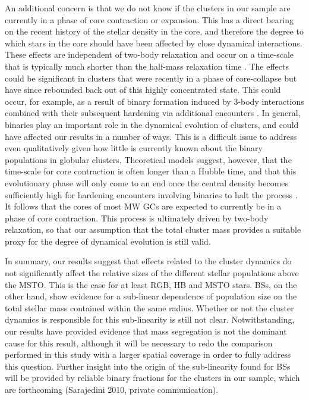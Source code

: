 An additional concern is that we do not know if the clusters in our
sample are currently in a phase of core contraction or expansion.  
This has a direct bearing on the recent history of the stellar density
in the core, and therefore the degree to which stars in the core
should have been affected by close dynamical interactions.  These
effects are independent of two-body relaxation and occur on a
time-scale that is typically much shorter than the half-mass relaxation
time \citep{heggie03}.  The effects could be significant
in clusters that were recently in a 
phase of core-collapse but have since rebounded back out of this 
highly concentrated state.  This could occur, for example, as a result
of binary 
formation induced by 3-body interactions combined with their subsequent
hardening via additional encounters \citep{hut83, heggie03}.  In general,
binaries play an important role in the dynamical evolution of
clusters, and could have affected our results in a number of ways.
This is a difficult issue to address even qualitatively 
given how little is currently known about the binary populations in
globular clusters.  Theoretical models suggest, however, that the
time-scale for core contraction is often longer than a Hubble time, and
that this evolutionary phase will only come to an end once the central
density becomes sufficiently high for hardening encounters involving
binaries to halt the process \citep{fregeau09}.  It
follows that the cores of most MW GCs are expected to currently be in
a phase of core contraction.  This process is ultimately driven by
two-body relaxation, so that our assumption that the total
cluster mass provides a suitable proxy for the degree of dynamical
evolution is still valid.

In summary, our results suggest that effects related to the cluster
dynamics do not significantly affect 
the relative sizes of the different stellar populations above the
MSTO.  This is the case for 
at least RGB, HB and MSTO stars.  BSs, on the other hand, show
evidence for a sub-linear dependence of population size on the total
stellar mass contained within the same radius.  Whether or not the
cluster dynamics is responsible for this sub-linearity is still not
clear.  Notwithstanding, our results have provided 
evidence that mass segregation is not the dominant cause for this
result, although it will be necessary to redo the comparison performed
in this study with a larger spatial coverage in order
to fully address this question.  Further insight into the origin of
the sub-linearity found for BSs will be provided by reliable
binary fractions for the clusters in our sample, which are forthcoming
(Sarajedini 2010, private communication).

